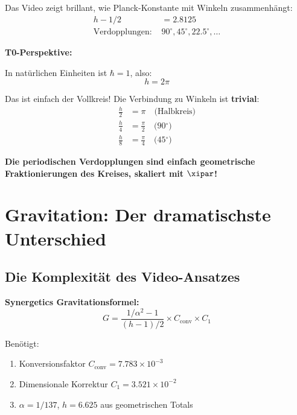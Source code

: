 	Das Video zeigt brillant, wie Planck-Konstante mit Winkeln zusammenhängt:
	\begin{align}
		h - 1/2 &= 2.8125 \\
		\text{Verdopplungen: } &90^\circ, 45^\circ, 22.5^\circ, \ldots
	\end{align}
	
	\begin{vorteil}
		\textbf{T0-Perspektive:}
		
		In natürlichen Einheiten ist $\hbar = 1$, also:
		\begin{equation}
			h = 2\pi
		\end{equation}
		
		Das ist einfach der Vollkreis! Die Verbindung zu Winkeln ist \textbf{trivial}:
		\begin{align}
			\frac{h}{2} &= \pi \quad \text{(Halbkreis)} \\
			\frac{h}{4} &= \frac{\pi}{2} \quad \text{(90$^\circ$)} \\
			\frac{h}{8} &= \frac{\pi}{4} \quad \text{(45$^\circ$)}
		\end{align}
		
		\textbf{Die periodischen Verdopplungen sind einfach geometrische Fraktionierungen des Kreises, skaliert mit $\xipar$!}
	\end{vorteil}
	
	\section{Gravitation: Der dramatischste Unterschied}
	
	\subsection{Die Komplexität des Video-Ansatzes}
	
	\textbf{Synergetics Gravitationsformel:}
	\begin{equation}
		G = \frac{1/\alpha^2 - 1}{(h - 1)/2} \times C_{\text{conv}} \times C_1
	\end{equation}
	
	Benötigt:
	\begin{enumerate}
		\item Konversionsfaktor $C_{\text{conv}} = 7.783 \times 10^{-3}$
		\item Dimensionale Korrektur $C_1 = 3.521 \times 10^{-2}$
		\item $\alpha = 1/137$, $h=6.625$ aus geometrischen Totals
	\end{enumerate}
	
